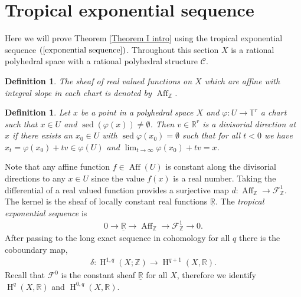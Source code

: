 \documentclass[11pt]{article}
\numberwithin{equation}{numsection}
\newcommand{\Z}{{\mathbb Z}}
\newcommand{\CC}{{\mathcal C}}
\newcommand{\RR}{{\mathbb R}}
\newcommand{\R}{{\mathbb R}}
\newcommand{\T}{{\mathbb T}}
\newcommand{\F}{{\mathcal F}}
\newcommand{\FS}{\mathcal{F}}
\DeclareMathOperator{\Aff}{Aff}
\DeclareMathOperator{\sed}{sed}
\DeclareMathOperator{\HH}{H}
\newtheorem{defn}[thm]{Definition}
\begin{document}
\section{Tropical exponential sequence}\label{sec:seq}
Here we will prove Theorem \ref{Theorem I intro} using the tropical exponential sequence $(\ref{exponential sequence})$. 
Throughout this section $X$ is a rational polyhedral space with a rational polyhedral structure $\CC$. 





\begin{defn} 
The sheaf of real valued functions on $X$ which are affine with integral slope in each chart is denoted by $\Aff_\Z$.  
\end{defn}

\begin{defn}
Let $x$ be a point in a polyhedral space $X$ 
and  $\varphi \colon U \to \T^r$ a chart such that $x \in U$ and $\sed(\varphi(x)) \neq \emptyset$. 
Then 
$v \in \R^r$ is a \emph{divisorial direction at $x$} 
if there exists an $x_0 \in U$ 
with $\sed \varphi (x_0) = \emptyset$ such that for all $t<0$ we have 
$x_t  = \varphi(x_0) +tv  \in \varphi(U)$ and $\lim_{t \to \infty}  \varphi(x_0) + tv   = x$.  
\end{defn}


Note that any affine function $f \in \Aff(U)$ is constant  along the divisorial directions to any $x \in U$ since the value  $f(x)$ is a real number.
Taking the differential of a real valued function  provides a surjective map 
$d \colon \Aff_\Z \to \FS_\Z^1$.  
The kernel is the sheaf of locally 
constant real functions $\underline{\R}$. 
The  \emph{tropical exponential sequence} is 
\begin{align} \label{exponential sequence}
0 \to \underline{\RR} \to \Aff_{\Z} \to \F_{\Z}^1 \to 0.
\end{align}
After passing to the long exact sequence in cohomology for all $q$ there is the  coboundary map,
\begin{align*}
\delta \colon \HH^{1,q}(X; {\mathbb{Z}}) \to \HH^{q+1}(X,\RR).
\end{align*}
Recall that $\mathcal{F}^0$ is the constant sheaf  $\underline{\R}$ for all $X$, 
therefore we identify  $\HH^q(X,\RR)$ and $\HH^{0,q}(X, \RR)$. 
\end{document}
